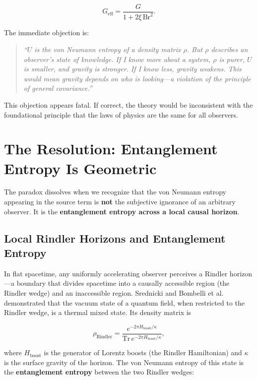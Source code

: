 \documentclass[11pt]{article}
\begin{document}
\begin{equation}\label{eq:Geff}
G_{\mathrm{eff}} = \frac{G}{1 + 2\xi\,\mathrm{Br}^2}.
\end{equation}

The immediate objection is:

\begin{quote}
\textit{“\(U\) is the von Neumann entropy of a density matrix \(\rho\). But \(\rho\) describes an observer's state of knowledge. If I know more about a system, \(\rho\) is purer, \(U\) is smaller, and gravity is stronger. If I know less, gravity weakens. This would mean gravity depends on who is looking—a violation of the principle of general covariance.”}
\end{quote}

This objection appears fatal. If correct, the theory would be inconsistent with the foundational principle that the laws of physics are the same for all observers.

\section{The Resolution: Entanglement Entropy Is Geometric}
\label{sec:resolution}

The paradox dissolves when we recognize that the von Neumann entropy appearing in the source term is \textbf{not} the subjective ignorance of an arbitrary observer. It is the \textbf{entanglement entropy across a local causal horizon}.

\subsection{Local Rindler Horizons and Entanglement Entropy}

In flat spacetime, any uniformly accelerating observer perceives a Rindler horizon—a boundary that divides spacetime into a causally accessible region (the Rindler wedge) and an inaccessible region. Srednicki \cite{srednicki1993} and Bombelli et al.\ \cite{bombelli1986} demonstrated that the vacuum state of a quantum field, when restricted to the Rindler wedge, is a thermal mixed state. Its density matrix is

\begin{equation}\label{eq:rho_rindler}
\rho_{\text{Rindler}} = \frac{e^{-2\pi H_{\text{boost}}/\kappa}}{\mathrm{Tr}\,e^{-2\pi H_{\text{boost}}/\kappa}},
\end{equation}

where \(H_{\text{boost}}\) is the generator of Lorentz boosts (the Rindler Hamiltonian) and \(\kappa\) is the surface gravity of the horizon. The von Neumann entropy of this state is the \textbf{entanglement entropy} between the two Rindler wedges:
\end{document}
